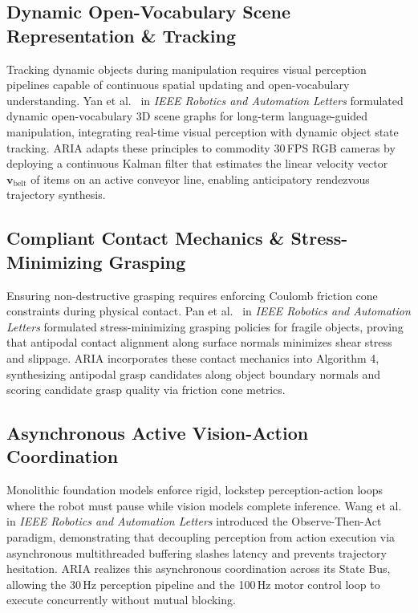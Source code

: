 \documentclass[journal]{IEEEtran}
\begin{document}
\subsection{Dynamic Open-Vocabulary Scene Representation \& Tracking}
Tracking dynamic objects during manipulation requires visual perception pipelines capable of continuous spatial updating and open-vocabulary understanding. Yan et al.~\cite{aria_055_yan_2025_dynamic} in \textit{IEEE Robotics and Automation Letters} formulated dynamic open-vocabulary 3D scene graphs for long-term language-guided manipulation, integrating real-time visual perception with dynamic object state tracking. ARIA adapts these principles to commodity 30\,FPS RGB cameras by deploying a continuous Kalman filter that estimates the linear velocity vector $\mathbf{v}_{\text{belt}}$ of items on an active conveyor line, enabling anticipatory rendezvous trajectory synthesis.

\subsection{Compliant Contact Mechanics \& Stress-Minimizing Grasping}
Ensuring non-destructive grasping requires enforcing Coulomb friction cone constraints during physical contact. Pan et al.~\cite{aria_025_group_2023_stressminimizing} in \textit{IEEE Robotics and Automation Letters} formulated stress-minimizing grasping policies for fragile objects, proving that antipodal contact alignment along surface normals minimizes shear stress and slippage. ARIA incorporates these contact mechanics into Algorithm 4, synthesizing antipodal grasp candidates along object boundary normals and scoring candidate grasp quality via friction cone metrics.

\subsection{Asynchronous Active Vision-Action Coordination}
Monolithic foundation models enforce rigid, lockstep perception-action loops where the robot must pause while vision models complete inference. Wang et al.~\cite{aria_096_group_2025_observe} in \textit{IEEE Robotics and Automation Letters} introduced the Observe-Then-Act paradigm, demonstrating that decoupling perception from action execution via asynchronous multithreaded buffering slashes latency and prevents trajectory hesitation. ARIA realizes this asynchronous coordination across its State Bus, allowing the 30\,Hz perception pipeline and the 100\,Hz motor control loop to execute concurrently without mutual blocking.
\end{document}
